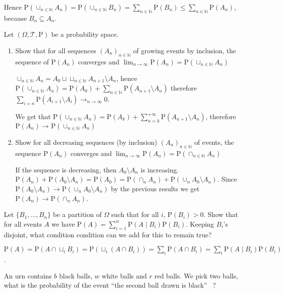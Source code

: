 \documentclass[a4paper,11pt]{exam}
\newcommand{\N}{\mathbb{N}}
\renewcommand{\P}{\mathrm{P}}
\begin{document}
\begin{questions}
\begin{solution}
	Hence $\P(\cup_{n \in \N}A_n) = \P(\cup_{n \in \N}B_n)
	= \sum_{n \in \N}\P(B_n) \leq \sum_{n \in \N}\P(A_n)$,
	because $B_n \subseteq A_n$.
\end{solution} 

\question
Let $(\Omega,\mathcal{T},\P)$ be a probability space.
\begin{enumerate}
	\item Show that for all sequences $(A_n)_{n \in \N}$ of growing events by inclusion, the sequence of $\P(A_n)$ converges and
	$
	\lim_{n \to \infty} \P(A_n) = \P(\cup_{n \in \N}A_n)
	$
	
	
	\begin{solution}
		$\cup_{n \in \N}A_n = A_0 \sqcup \sqcup_{n \in \N}A_{n+1}\setminus A_n$,
		hence $\P(\cup_{n \in \N}A_n)
		= \P(A_0) + \sum_{n \in \N}\P(A_{n+1} \setminus A_n)$ therefore
		$\sum_{i = n}\P(A_{i+1}\setminus A_i) \to_{n \to \infty}0$.
		
		We get that $\P(\cup_{n \in \N}A_n)
		= \P(A_k) + \sum_{n = k}^{+\infty}\P(A_{n+1} \setminus A_n)$, therefore
		$\P(A_n) \to_{} \P(\cup_{n \in \N}A_n)$
	\end{solution}
	
	\item Show for all decreasing sequences  (by inclusion) $(A_n)_{n \in \N}$ of events, the sequence $\P(A_n)$ converges and
	$
	\lim_{n \to \infty} \P(A_n) = \P(\cap_{n \in \N}A_n)
	$
	
	\begin{solution}
		If the sequence is decreasing, then $A_0 \setminus A_n$ is increasing.
		$\P(A_n) + \P(A_0 \setminus A_n) = \P(A_0)
		= \P(\cap_{n}A_n) + \P(\cup_{n}A_0\setminus A_n)$.
		Since $\P(A_0 \setminus A_n) \to \P(\cup_{n}A_0\setminus A_n)$ by the previous results we get $\P(A_n) \to \P(\cap_{n}A_n)$.
	\end{solution} 
\end{enumerate}

\question
Let $\{B_1,\dots,B_n\}$ be a partition of $\Omega$ such that for all $i$,
$\P(B_i) > 0$.
Show that for all events $A$ we have
$
\P(A) = \sum_{i = 1}^n \P(A \mid B_i) \P(B_i)
$. 
Keeping $B_i$'s disjoint, what condition condition can we add for this to remain true?
\begin{solution}
	$\P(A)
	= \P(A \cap \sqcup_iB_i)
	= \P(\sqcup_i(A \cap B_i))
	= \sum_{i} \P(A \cap B_i)
	= \sum_{i} \P(A \mid B_i)\P(B_i)$.
\end{solution} 

\question
An urn contains $ b $ black balls, $ w $ white balls and $ r $ red balls.
We pick two balls, what is the probability of the event ``the second ball drawn is
black'' ~?


\end{questions}
\end{document}
